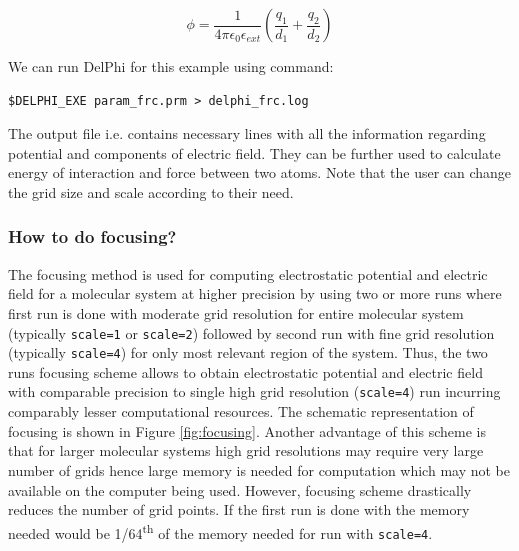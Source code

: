 \documentclass[9pt,tutorial,pubversion]{livecoms}
\newcommand*\ttvar[1]{\texttt{\expandafter\dottvar\detokenize{#1}\relax}}
\newcommand*\dottvar[1]{\ifx\relax#1\else
  \expandafter\ifx\string_#1\string_\allowbreak\else#1\fi
  \expandafter\dottvar\fi}
\begin{document}
\begin{equation}\label{eqn:frc_at_point}
    \phi = \frac{1}{4\pi\epsilon_0\epsilon_{ext}} \left ( \frac{q_1}{d_1} + \frac{q_2}{d_2} \right)
\end{equation}

We can run DelPhi for this example using command:

\begin{verbatim}
$DELPHI_EXE param_frc.prm > delphi_frc.log
\end{verbatim}

The output \ttvar{frc} file i.e. \ttvar{atoms.frc} contains necessary lines with all the information regarding potential and components of electric field. They can be further used to calculate energy of interaction and force between two atoms. Note that the user can change the grid size and scale according to their need.

\subsubsection{How to do focusing?}

The focusing method is used for computing electrostatic potential and electric field for a molecular system at higher precision by using two or more runs where first run is done with moderate grid resolution for entire molecular system (typically \texttt{scale=1} or \texttt{scale=2}) followed by second run with fine grid resolution (typically \texttt{scale=4}) for only most relevant region of the system.  Thus, the two runs focusing scheme allows to obtain electrostatic potential and electric field with comparable precision to single high grid resolution (\texttt{scale=4}) run incurring comparably lesser computational resources. The schematic representation of focusing is shown in Figure \ref{fig:focusing}. Another advantage of this scheme is that for larger molecular systems high grid resolutions may require very large number of grids hence large memory is needed for computation which may not be available on the computer being used. However, focusing scheme drastically reduces the number of grid points. If the first run is done with \ttvar{scale=1} the memory needed would be \ttvar{~}1/64\textsuperscript{th} of the memory needed for run with \texttt{scale=4}. 
\end{document}
